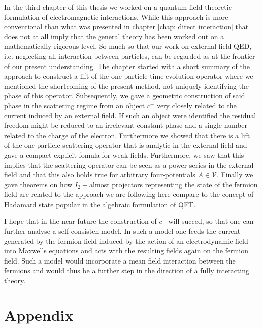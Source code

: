 \documentclass[b5paper,draft,openbib,12pt]{memoir}
\begin{document}
In the third chapter of this thesis we worked on a quantum 
field theoretic formulation of electromagnetic interactions.
While this approach is more conventional than what was 
presented in chapter \ref{chap: direct interaction} 
that does not at all imply that the general theory has been worked 
out on a mathematically rigorous level. So much so that 
our work on external field QED, i.e. neglecting all 
interaction between particles, can be regarded as 
at the frontier of our present understanding. 
The chapter started with a short summary of the 
approach to construct a lift of the one-particle 
time evolution operator where we mentioned 
the shortcoming of the present method, not
uniquely identifying the phase of this operator.
Subsequently, we gave a geometric construction of 
said phase in the scattering regime 
from an object \(c^+\) very closely related to the 
current induced by an external field. If such an 
object were identified the residual freedom might be 
reduced to an irrelevant constant phase and a single 
number related to the charge of the electron.  
Furthermore we showed that there is a lift of the 
one-particle scattering operator that is analytic in the 
external field and gave a compact explicit fomula for 
weak fields. Furthermore, we saw that this implies 
that the scattering operator can be seen as a power 
series in the external field and that this also 
holds true for arbitrary four-potentials 
\(A\in\mathcal{V}\). Finally we gave theorems on how 
\(I_2-\)almost projectors representing the state 
of the fermion field are related to the approach we 
are following here compare to the concept of Hadamard 
state popular in the algebraic formulation of QFT.

I hope that in the near future the construction of 
\(c^+\) will succed, so that one can further analyse 
a self consisten model. In such a model one 
feeds the current generated by the 
fermion field induced by the action of an electrodynamic 
field into Maxwells equations and acts with the 
resulting fields again on the fermion field. Such a 
model would incorporate a mean field interaction between 
the fermions and would thus be a further 
step in the direction 
of a fully interacting theory.












\chapter{Appendix}
\end{document}
